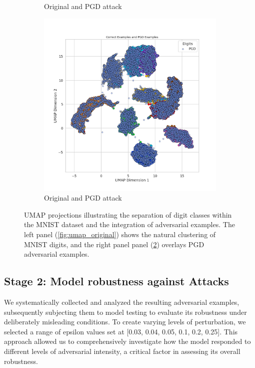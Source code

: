 \documentclass[10pt, conference, a4paper, final]{IEEEtran}
\begin{document}
\begin{figure}[!ht]
\begin{subfigure}{.25\textwidth}
        \caption{Original and PGD attack}
        \label{fig:umap_pgd}
    \end{subfigure}
    \hfill
    \begin{subfigure}{.25\textwidth}
        \centering
        \includegraphics[width=\linewidth]{UMAP/UMAP_Combined_PGD.png}
        \caption{Original and PGD attack}
        \label{fig:umap_pgd}
    \end{subfigure}
    \caption{UMAP projections illustrating the separation of digit classes within the MNIST dataset and the integration of adversarial examples.
     The left panel (\ref{fig:umap_original}) shows the natural clustering of MNIST digits, and the right panel panel (\ref{fig:umap_pgd}) overlays PGD 
     adversarial examples.}
    \label{fig:umap}
\end{figure}

\subsection{Stage 2: Model robustness against Attacks}
We systematically collected and analyzed the resulting adversarial examples, subsequently subjecting them to model testing to evaluate its robustness under deliberately misleading conditions. To create varying levels of perturbation, we selected a range of epsilon values set at [0.03, 0.04, 0.05, 0.1, 0.2, 0.25]. This approach allowed us to comprehensively investigate how the model responded to different levels of adversarial intensity, a critical factor in assessing its overall robustness.
\end{document}
